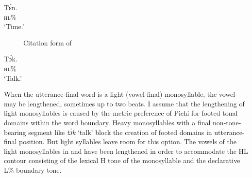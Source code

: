 \ea\label{ex:key:43}
\gll Tɛ́n.\\
\textsc{hl\%}\\
\glt  ‘Time.’
\z

\begin{figure}
	\caption{Citation form of }
	\label{fig:key:3.2}
\end{figure}

\ea\label{ex:key:44}
\gll Tɔ́k.\\
\textsc{hl\%}\\
\glt ‘Talk.’
\z

When the utterance-final word is a light (vowel-final) monosyllable, the vowel may be lengthened, sometimes up to two beats. I assume that the lengthening of light monosyllables is caused by the metric preference of Pichi for footed tonal domains within the word boundary. Heavy monosyllables with a final non-tone-bearing segment like \textit{tɔ́k} ‘talk’ block the creation of footed domains in utterance-final position. But light syllables leave room for this option. The vowels of the light monosyllables in  and  have been lengthened in order to accommodate the HL contour consisting of the lexical H tone of the monosyllable and the declarative L\% boundary tone. 

